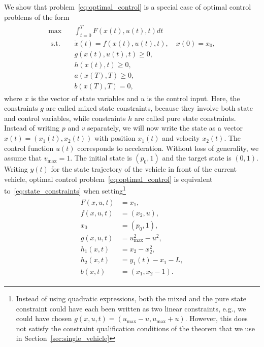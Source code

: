 \documentclass[a4paper]{article}
\theoremstyle{definition}
\theoremstyle{plain}
\begin{document}
We show that problem~\eqref{eq:optimal_control} is a special case of optimal
control problems of the form
\begin{align}
  \begin{split}
  \label{eq:state_constraints}
  \max \quad & \int_{t=0}^{T} F(x(t), u(t), t) dt \\
  \text{ s.t. } \;\, & \dot{x}(t) = f(x(t), u(t), t) , \quad x(0) = x_{0} , \\
                & g(x(t), u(t), t) \geq 0 , \\
             & h(x(t), t) \geq 0 , \\
             & a(x(T), T) \geq 0 , \\
             & b(x(T), T) = 0 ,
  \end{split}
\end{align}
where $x$ is the vector of state variables and $u$ is the control input.
%
Here, the constraints $g$ are called mixed state constraints, because they
involve both state and control variables, while constraints $h$ are called pure
state constraints.
%
Instead of writing $p$ and $v$ separately, we will now write the state as a
vector $x(t) = (x_{1}(t), x_{2}(t))$ with position $x_{1}(t)$ and velocity
$x_{2}(t)$. The control function $u(t)$ corresponds to acceleration. Without
loss of generality, we assume that $v_{\max} = 1$. The initial state is
$(p_{0}, 1)$ and the target state is $(0, 1)$.
%
Writing $y(t)$ for the state trajectory of the vehicle in front of the current
vehicle, optimal control problem~\eqref{eq:optimal_control} is equivalent
to~\eqref{eq:state_constraints} when setting\footnote{Instead of using quadratic
  expressions, both the mixed and the pure state constraint could have each been
  written as two linear constraints, e.g., we could have chosen
  $g(x, u, t) = (u_{\max} - u, u_{\max} + u)$. However, this does not satisfy
  the constraint qualification conditions of the theorem that we use in
  Section~\ref{sec:single_vehicle}}
\begin{align}
  \label{eq:settings}
\begin{split}
  F(x, u, t) &= x_{1} , \\
  f(x, u, t) &= (x_{2}, u) , \\
  x_{0} &= (p_{0}, 1) , \\
  g(x, u, t) &= u_{\max}^{2} - u^{2} , \\
  h_{1}(x, t) &= x_{2} - x_{2}^{2} , \\
  h_{2}(x, t) &= y_{1}(t) - x_{1} - L , \\
  b(x, t) &= (x_{1}, x_{2} - 1) .
\end{split}
\end{align}
\end{document}
